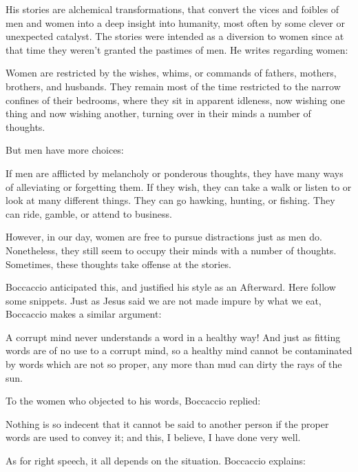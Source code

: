 His stories are alchemical transformations, that convert the vices and foibles of men and women into a deep insight into humanity, most often by some clever or unexpected catalyst. The stories were intended as a diversion to women since at that time they weren't granted the pastimes of men. He writes regarding women:

\begin{quotex}
Women are restricted by the wishes, whims, or commands of fathers, mothers, brothers, and husbands. They remain most of the time restricted to the narrow confines of their bedrooms, where they sit in apparent idleness, now wishing one thing and now wishing another, turning over in their minds a number of thoughts.
\end{quotex}


But men have more choices:

\begin{quotex}
If men are afflicted by melancholy or ponderous thoughts, they have many ways of alleviating or forgetting them. If they wish, they can take a walk or listen to or look at many different things. They can go hawking, hunting, or fishing. They can ride, gamble, or attend to business.
\end{quotex}


However, in our day, women are free to pursue distractions just as men do. Nonetheless, they still seem to occupy their minds with a number of thoughts. Sometimes, these thoughts take offense at the stories.

Boccaccio anticipated this, and justified his style as an Afterward. Here follow some snippets. Just as Jesus said we are not made impure by what we eat, Boccaccio makes a similar argument:

\begin{quotex}
A corrupt mind never understands a word in a healthy way! And just as fitting words are of no use to a corrupt mind, so a healthy mind cannot be contaminated by words which are not so proper, any more than mud can dirty the rays of the sun.
\end{quotex}


To the women who objected to his words, Boccaccio replied:

\begin{quotex}
Nothing is so indecent that it cannot be said to another person if the proper words are used to convey it; and this, I believe, I have done very well.
\end{quotex}


As for right speech, it all depends on the situation. Boccaccio explains:

